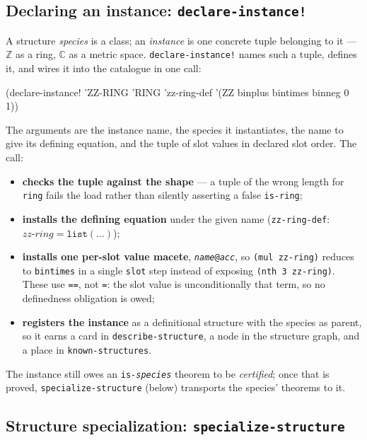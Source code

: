 \subsection{Declaring an instance: \texttt{declare-instance!}}
\label{sec:declare-instance}

A structure \emph{species} is a class; an \emph{instance} is one concrete tuple
belonging to it --- $\mathbb{Z}$ as a ring, $\mathbb{C}$ as a metric space.
\texttt{declare-instance!} names such a tuple, defines it, and wires it into the
catalogue in one call:

\begin{VNBcode}
(declare-instance! 'ZZ-RING 'RING 'zz-ring-def
  '(ZZ binplus bintimes binneg 0 1))
\end{VNBcode}

The arguments are the instance name, the species it instantiates, the name to
give its defining equation, and the tuple of slot values in declared slot order.
The call:
\begin{itemize}
\item \textbf{checks the tuple against the shape} --- a tuple of the wrong length
  for \texttt{ring} fails the load rather than silently asserting a false
  \texttt{is-ring};
\item \textbf{installs the defining equation} under the given name
  (\texttt{zz-ring-def}: $\mathit{zz\text{-}ring} = \mathtt{list}(\ldots)$);
\item \textbf{installs one per-slot value macete}, \texttt{\textit{name}@\textit{acc}},
  so \texttt{(mul zz-ring)} reduces to \texttt{bintimes} in a single
  \texttt{slot} step instead of exposing \texttt{(nth 3 zz-ring)}.  These use
  \texttt{==}, not \texttt{=}: the slot value is unconditionally that term, so no
  definedness obligation is owed;
\item \textbf{registers the instance} as a definitional structure with the
  species as parent, so it earns a card in \texttt{describe-structure}, a node in
  the structure graph, and a place in \texttt{known-structures}.
\end{itemize}
The instance still owes an \texttt{is-\textit{species}} theorem to be
\emph{certified}; once that is proved, \texttt{specialize-structure} (below)
transports the species' theorems to it.

\subsection{Structure specialization: \texttt{specialize-structure}}
\label{sec:specialize-structure}

